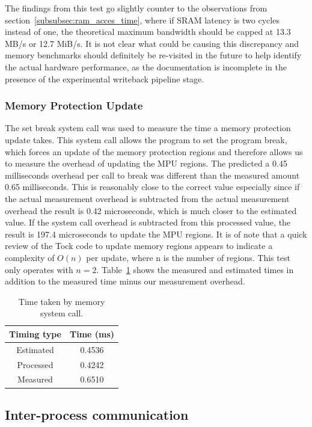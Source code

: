 \documentclass{article}
\begin{document}
The findings from this test go slightly counter to the observations from section~\ref{subsubsec:ram_acces_time}, where if SRAM latency is two cycles instead of one, the theoretical maximum bandwidth should be capped at 13.3 MB/s or 12.7 MiB/s. It is not clear what could be causing this discrepancy and memory benchmarks should definitely be re-visited in the future to help identify the actual hardware performance, as the documentation is incomplete in the presence of the experimental writeback pipeline stage.

\subsubsection{Memory Protection Update}

The set break system call was used to measure the time a memory protection update takes. This system call allows the program to set the program break, which forces an update of the memory protection regions and therefore allows us to measure the overhead of updating the MPU regions. The predicted a 0.45 milliseconds overhead per call to break was different than the measured amount 0.65 milliseconds. This is reasonably close to the correct value especially since if the actual measurement overhead is subtracted from the actual measurement overhead the result is 0.42 microseconds, which is much closer to the estimated value. If the system call overhead is subtracted from this processed value, the result is 197.4 microseconds to update the MPU regions. It is of note that a quick review of the Tock code to update memory regions appears to indicate a complexity of $O(n)$ per update, where n is the number of regions. This test only operates with $n = 2$. Table~\ref{table:mem-overhead} shows the measured and estimated times in addition to the measured time minus our measurement overhead.

\begin{table}[h!]
\centering
\begin{tabular}{|c||c|} 
 \hline
 Timing type & Time (ms) \\
 \hline
 \hline
 Estimated & 0.4536\\
 \hline
 Processed & 0.4242\\ 
 \hline
 Measured & 0.6510\\
 \hline
\end{tabular}
\caption{Time taken by memory system call.}
\label{table:mem-overhead}
\end{table}

\subsection{Inter-process communication}
\end{document}
